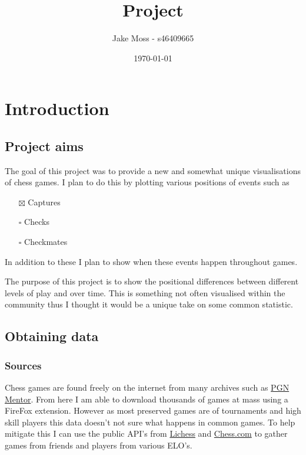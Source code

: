 \documentclass[11pt]{article}
\author{Jake Moss - s46409665}
\date{\today}
\title{Project}
\begin{document}
\maketitle
\tableofcontents



\section{Introduction}
\label{sec:org124c731}
\subsection{Project aims}
\label{sec:org0cbc82a}
The goal of this project was to provide a new and somewhat unique visualisations of chess games. I plan to do this by plotting various positions of events such as
\begin{itemize}
\item[{$\boxtimes$}] Captures
\item[{$\square$}] Checks
\item[{$\square$}] Checkmates
\end{itemize}
In addition to these I plan to show when these events happen throughout games.

The purpose of this project is to show the positional differences between different levels of play and over time. This is something not often visualised within the community thus I thought it would be a unique take on some common statistic.
\subsection{Obtaining data}
\label{sec:org4e20b33}
\subsubsection{Sources}
\label{sec:org57e0bc1}
Chess games are found freely on the internet from many archives such as \href{https://www.pgnmentor.com/files.html}{PGN Mentor}. From here I am able to download thousands of games at mass using a FireFox extension. However as most preserved games are of tournaments and high skill players this data doesn't not sure what happens in common games. To help mitigate this I can use the public API's from \href{https://lichess.org/}{Lichess} and \href{https://www.chess.com/}{Chess.com} to gather games from friends and players from various ELO's.
\end{document}
